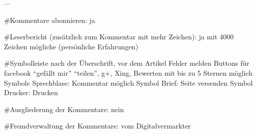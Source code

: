 ---

#Kommentare abonnieren: ja

#Leserbericht (zusätzlich zum Kommentar mit mehr Zeichen): ja mit 4000 Zeichen mögliche (persönliche Erfahrungen)


#Symbolleiste nach der Überschrift, vor dem Artikel
	Fehler melden
	Buttons für facebook ``gefällt mir'' ``teilen'', g+, Xing, Bewerten mit bis zu 5 Sternen möglich
	Symbole Sprechblase: Kommentar möglich
	Symbol Brief: Seite versenden
	Symbol Drucker: Drucken

#Ausgliederung der Kommentare: nein

#Fremdverwaltung der Kommentare: vom Digitalvermarkter